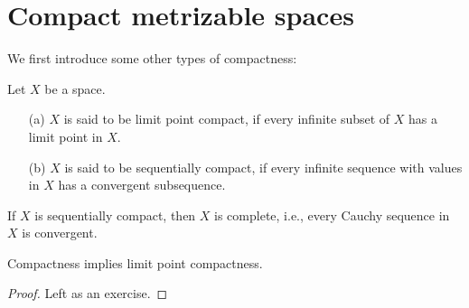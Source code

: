 \section{Compact metrizable spaces}

We first introduce some other types of compactness:
\begin{defi}
    Let $X$ be a space.
    \begin{enumerate}
        \item[(a)] $X$ is said to be limit point compact, if every infinite subset of $X$ has a limit point in $X$.
        \item[(b)] $X$ is said to be sequentially compact, if every infinite sequence with values in $X$ has a convergent subsequence.
    \end{enumerate}
\end{defi}
\begin{rmk}
    If $X$ is sequentially compact, then $X$ is complete, i.e., every Cauchy sequence in $X$ is convergent.
\end{rmk}

\begin{prop}
    Compactness implies limit point compactness.
\end{prop}
\begin{proof}
    Left as an exercise.
\end{proof}

